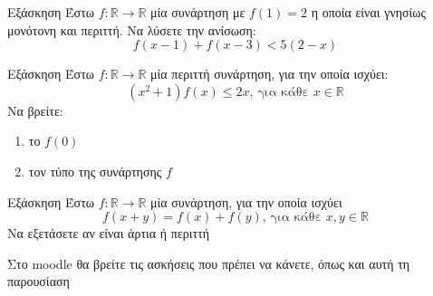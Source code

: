 \documentclass{presentation}
\begin{document}
\begin{frame}{Εξάσκηση}
      Έστω $f:\mathbb{R}\to\mathbb{R}$ μία συνάρτηση με $f(1)=2$ η οποία είναι γνησίως μονότονη και περιττή. Να λύσετε την ανίσωση:
      $$f(x-1)+f(x-3)<5(2-x)$$
\end{frame}

\begin{frame}{Εξάσκηση}
      Έστω $f:\mathbb{R}\to\mathbb{R}$ μία περιττή συνάρτηση, για την οποία ισχύει:
      $$(x^2+1)f(x)\le 2x \text{, για κάθε } x\in\mathbb{R}$$
      Να βρείτε:
      \begin{enumerate}
            \item το $f(0)$ \pause
            \item τον τύπο της συνάρτησης $f$
      \end{enumerate}
\end{frame}

\begin{frame}{Εξάσκηση}
      Έστω $f:\mathbb{R}\to\mathbb{R}$ μία συνάρτηση, για την οποία ισχύει
      $$f(x+y)=f(x)+f(y)\text{, για κάθε } x,y\in\mathbb{R}$$
      Να εξετάσετε αν είναι άρτια ή περιττή
\end{frame}

\begin{frame}
      Στο moodle θα βρείτε τις ασκήσεις που πρέπει να κάνετε, όπως και αυτή τη παρουσίαση
\end{frame}
\end{document}
